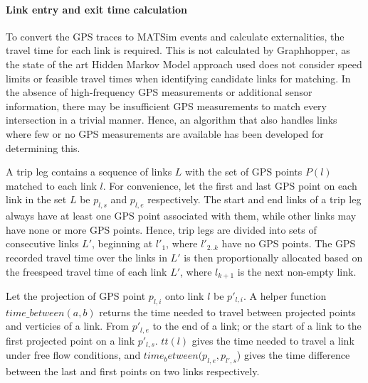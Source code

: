 \paragraph{Link entry and exit time calculation}
To convert the GPS traces to MATSim events and calculate externalities, the travel time for each link is required.
This is not calculated by Graphhopper, as the state of the art Hidden Markov Model approach used \citep{newson2009hidden} does not consider speed limits or feasible travel times when identifying candidate links for matching.
In the absence of high-frequency GPS measurements or additional sensor information, there may be insufficient GPS measurements to match every intersection in a trivial manner.
Hence, an algorithm that also handles links where few or no GPS measurements are available has been developed for determining this.

A trip leg contains a sequence of links $L$ with the set of GPS points $P(l)$ matched to each link $l$.
For convenience, let the first and last GPS point on each link in the set $L$ be $p_{l,s}$ and $p_{l,e}$ respectively.
The start and end links of a trip leg always have at least one GPS point associated with them, while other links may have none or more GPS points.
Hence, trip legs are divided into sets of consecutive links  $L'$, beginning at $l'_1$,  where $l'_{2..k}$ have no GPS points.
The GPS recorded travel time over the links in $L'$ is then proportionally allocated based on the freespeed travel time of each link $L'$, where $l_{k+1}$ is the next non-empty link.

Let the projection of GPS point $p_{l,i}$ onto link $l$ be $p'_{l,i}$.
A helper function $time\_between(a,b)$ returns the time needed to travel between projected points and verticies of a link.
From $p'_{l,e}$ to the end of a link; or the start of a link to the first projected point on a link $p'_{l,s}$.
$tt(l)$ gives the time needed to travel a link under free flow conditions, and $time_between(p_{l,e}, p_{l',s}$) gives the time difference between the last and first points on two links respectively.

